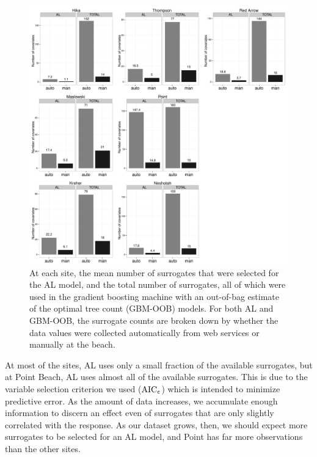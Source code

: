 \documentclass[authoryear,review, 12pt]{elsarticle}
\begin{document}
\begin{figure}
\includegraphics[width=\textwidth]{fig5/covariate-count.PDF}
\caption{At each site, the mean number of surrogates that were selected
for the AL model, and the total number of surrogates, all of which were
used in the gradient boosting machine with an out-of-bag estimate of the
optimal tree count (GBM-OOB) models. For both AL and GBM-OOB, the
surrogate counts are broken down by whether the data values were
collected automatically from web services or manually at the beach.}
\end{figure}

At most of the sites, AL uses only a small fraction of the available
surrogates, but at Point Beach, AL uses almost all of the available
surrogates. This is due to the variable selection criterion we used
(\(\text{AIC}_{\tt c}\)) which is intended to minimize predictive error.
As the amount of data increases, we accumulate enough information to
discern an effect even of surrogates that are only slightly correlated
with the response. As our dataset grows, then, we should expect more
surrogates to be selected for an AL model, and Point has far more
observations than the other sites.
\end{document}
